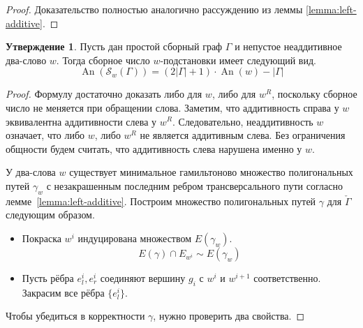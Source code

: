 \documentclass{article}
\theoremstyle{definition}
\newtheorem{conjecture}[theorem]{Утверждение}
\newcommand{\An}{\operatorname{An}}
\begin{document}
\begin{proof}
    Доказательство полностью аналогично рассуждению из леммы \ref{lemma:left-additive}.
\end{proof}

\begin{conjecture}\label{conj:an-additive-saturation}
    Пусть дан простой сборный граф $\Gamma$ и непустое неаддитивное два-слово $w$. Тогда сборное число $w$-подстановки имеет следующий вид.
    \[
        \An(\mathcal{S}_w(\Gamma)) = (2|\Gamma| + 1)\cdot\An(w) - |\Gamma|
    \]

\end{conjecture}

\begin{proof}
    Формулу достаточно доказать либо для $w$, либо для $w^R$, поскольку сборное число не меняется при обращении слова. Заметим, что аддитивность справа у $w$ эквивалентна аддитивности слева у $w^R$. Следовательно, неаддитивность $w$ означает, что либо $w$, либо $w^R$ не является аддитивным слева. Без ограничения общности будем считать, что аддитивность слева нарушена именно у $w$.
 
    У два-слова $w$ существует минимальное гамильтоново множество полигональных путей $\gamma_w$ с незакрашенным последним ребром трансверсального пути согласно лемме~\ref{lemma:left-additive}.
    Построим множество полигональных путей $\gamma$ для $\check{\Gamma}$ следующим образом.
    \begin{itemize}
        \item Покраска $w^i$ индуцирована множеством $E(\gamma_w)$.
        \[
            E(\gamma) \cap E_{w^i} \sim E(\gamma_w)
        \]
        \item Пусть рёбра $e_l^i, e_r^i$ соединяют вершину $g_i$ с $w^i$ и $w^{i + 1}$ соответственно. Закрасим все рёбра $\{e_l^i\}$.
    \end{itemize}

    Чтобы убедиться в корректности $\gamma$, нужно проверить два свойства.


\end{proof}
\end{document}
